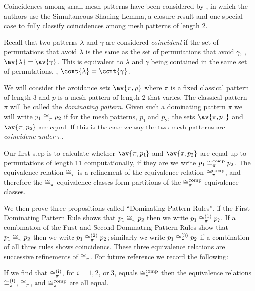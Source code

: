 Coincidences among small mesh patterns have been considered by
\textcite{DBLP:journals/corr/ClaessonTU14}, in which the authors use the Simultaneous Shading Lemma,
a closure result and one special case to fully classify coincidences among mesh patterns
of length 2.

Recall that two patterns \(\lambda\) and \(\gamma\) are considered \emph{coincident} if the set of permutations
that avoid \(\lambda\) is the same as the set of permutations that avoid \(\gamma\),
\ie, \(\av{\lambda} = \av{\gamma}\). This is equivalent to \(\lambda\) and \(\gamma\) being contained in
the same set of permutations, \ie, \(\cont{\lambda} = \cont{\gamma}\).

We will consider the avoidance sets \(\av{\pi,p}\) where \(\pi\) is a fixed
classical pattern of length 3 and \(p\) is a mesh pattern of length 2 that
varies. The classical pattern \(\pi\) will be called the \emph{dominating
pattern}. Given such a dominating pattern \(\pi\) we will write \(p_1
\coinc{\pi} p_2\) if for the mesh patterns, \(p_1\) and \(p_2\),  the sets
\(\av{\pi,p_1}\) and \(\av{\pi,p_2}\) are equal. If this is the case we say
the two mesh patterns are \emph{coincidenc under} \(\pi\).

Our first step is to calculate whether \(\av{\pi,p_1}\) and \(\av{\pi,p_2}\) are
equal up to permutations of length 11 computationally, if they are we write
\(p_1 \coinc[comp]{\pi} p_2\). The equivalence relation \(\coinc{\pi}\) is a
refinement of the equivalence relation \(\coinc[comp]{\pi}\), and therefore the
\(\coinc{\pi}\)-equivalence classes form partitions of the
\(\coinc[comp]{\pi}\)-equivalence classes.

We then prove three propositions called ``Dominating Pattern Rules'', if the
First Dominating Pattern Rule shows that \(p_1 \coinc{\pi} p_2\) then we write
\(p_1 \coinc[(1)]{\pi} p_2\). If a combination of the First and Second
Dominating Pattern Rules show that \(p_1 \coinc{\pi} p_2\) then we write
\(p_1 \coinc[(2)]{\pi} p_2\); similarly we write \(p_1 \coinc[(3)]{\pi} p_2\) if
a combination of all three rules shows coincidence. These three equivalence
relations are successive refinements of \(\coinc{\pi}\). For future reference
we record the following:

\begin{note}
\label{note:main}
    If we find that \(\coinc[(i)]{\pi}\), for \(i = 1, 2\), or \(3\),
    equals \(\coinc[comp]{\pi}\) then the equivalence relations \(\coinc[(i)]{\pi}\), \(\coinc{\pi}\),
    and \(\coinc[comp]{\pi}\) are all equal.
\end{note}

